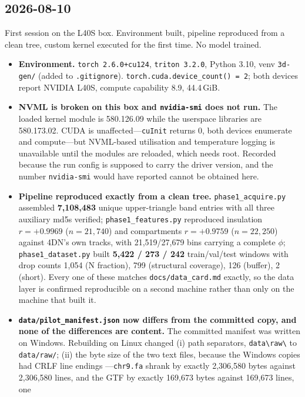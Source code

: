 \documentclass[11pt,a4paper]{article}
\newcommand{\code}[1]{\texttt{\small #1}}
\newcommand{\warn}[1]{\textcolor{warncol}{\textbf{#1}}}
\begin{document}
\subsection*{2026-08-10}

First session on the L40S box. Environment built, pipeline reproduced from a
clean tree, custom kernel executed for the first time. No model trained.

\begin{itemize}
\item \textbf{Environment.} \code{torch 2.6.0+cu124}, \code{triton 3.2.0},
Python 3.10, venv \code{3d-gen/} (added to \code{.gitignore}).
\code{torch.cuda.device\_count() = 2}; both devices report NVIDIA L40S,
compute capability 8.9, 44.4\,GiB.
\item \warn{NVML is broken on this box and \code{nvidia-smi} does not run.}
The loaded kernel module is 580.126.09 while the userspace libraries are
580.173.02. CUDA is unaffected---\code{cuInit} returns 0, both devices
enumerate and compute---but NVML-based utilisation and temperature logging is
unavailable until the modules are reloaded, which needs root. Recorded because
the run config is supposed to carry the driver version, and the number
\code{nvidia-smi} would have reported cannot be obtained here.
\item \textbf{Pipeline reproduced exactly from a clean tree.}
\code{phase1\_acquire.py} assembled \textbf{7{,}108{,}483} unique
upper-triangle band entries with all three auxiliary md5s verified;
\code{phase1\_features.py} reproduced insulation $r=+0.9969$ ($n=21{,}740$) and
compartments $r=+0.9759$ ($n=22{,}250$) against 4DN's own tracks, with
21{,}519/27{,}679 bins carrying a complete $\phi$; \code{phase1\_dataset.py}
built \textbf{5{,}422 / 273 / 242} train/val/test windows with drop counts
1{,}054 (N fraction), 799 (structural coverage), 126 (buffer), 2 (short).
Every one of these matches \code{docs/data\_card.md} exactly, so the data
layer is confirmed reproducible on a second machine rather than only on the
machine that built it.
\item \warn{\code{data/pilot\_manifest.json} now differs from the committed
copy, and none of the differences are content.} The committed manifest was
written on Windows. Rebuilding on Linux changed (i) path separators,
\code{data\textbackslash raw\textbackslash} to \code{data/raw/}; (ii) the byte
size of the two text files, because the Windows copies had CRLF line endings
---\code{chr9.fa} shrank by exactly 2{,}306{,}580 bytes against 2{,}306{,}580
lines, and the GTF by exactly 169{,}673 bytes against 169{,}673 lines, one

\end{itemize}
\end{document}
